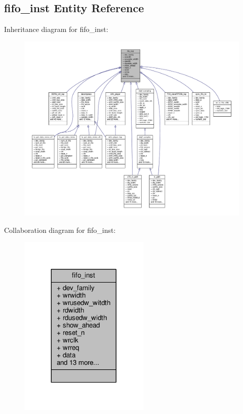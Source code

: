 \subsection{fifo\+\_\+inst Entity Reference}
\label{classfifo__inst}


Inheritance diagram for fifo\+\_\+inst\+:\nopagebreak
\begin{figure}[H]
\begin{center}
\leavevmode
\includegraphics[width=350pt]{d2/d32/classfifo__inst__inherit__graph}
\end{center}
\end{figure}


Collaboration diagram for fifo\+\_\+inst\+:\nopagebreak
\begin{figure}[H]
\begin{center}
\leavevmode
\includegraphics[width=176pt]{df/d32/classfifo__inst__coll__graph}
\end{center}
\end{figure}
